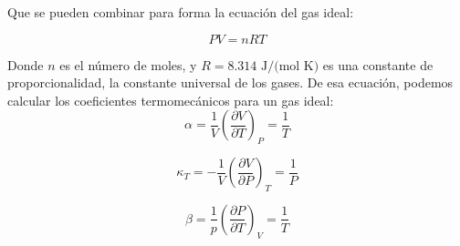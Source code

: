 \documentclass[a4paper,12pt]{article}
\begin{document}
Que se pueden combinar para forma la ecuación del gas ideal:

\begin{equation}
  PV = nRT 
\end{equation}

Donde $n$ es el número de moles, y $R = 8.314 \text{ J/(mol K)}$ es una constante de proporcionalidad, la constante universal de los gases. De esa ecuación, podemos calcular los coeficientes termomecánicos para un gas ideal:
\begin{equation}
  \alpha = \frac{1}{V}\left(\frac{\partial V}{\partial T}\right)_P = \frac{1}{T}
\end{equation}

\begin{equation}
  \kappa_T = -\frac{1}{V}\left(\frac{\partial V}{\partial P}\right)_T = \frac{1}{P}
\end{equation}

\begin{equation}
  \beta = \frac{1}{p}\left(\frac{\partial P}{\partial T}\right)_V = \frac{1}{T}
\end{equation}
\end{document}
